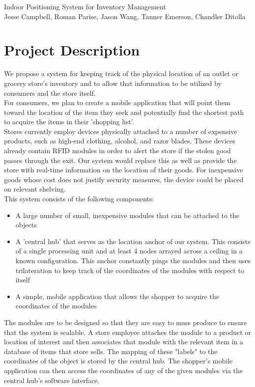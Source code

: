 \documentclass{article}
\begin{document}
\begin{center}
{\Large Indoor Positioning System for Inventory Management} \\
{\small Jesse Campbell, Roman Parise, Jason Wang, Tanner Emerson, Chandler Ditolla}
\end{center}
\section{Project Description}
We propose a system for keeping track of the physical location of an outlet or grocery store's inventory and to allow that information to be utilized by consumers and the store itself. \\

For consumers, we plan to create a mobile application that will point them toward the location of the item they seek and potentially find the shortest path to acquire the items in their 'shopping list'. \\

Stores currently employ devices physically attached to a number of expensive products, such as high-end clothing, alcohol, and razor blades. These devices already contain RFID modules in order to alert the store if the stolen good passes through the exit. Our system would replace this as well as provide the store with real-time information on the location of their goods. For inexpensive goods whose cost does not justify security measures, the device could be placed on relevant shelving.\\

This system consists of the following components:
\begin{itemize}
\item A large number of small, inexpensive modules that can be attached to the objects
\item A 'central hub' that serves as the location anchor of our system. This consists of a single processing unit and at least 4 nodes arrayed across a ceiling in a known configuration. This anchor constantly pings the modules and then uses trilateration to keep track of the coordinates of the modules with respect to itself
\item A simple, mobile application that allows the shopper to acquire the coordinates of the modules
\end{itemize}
The modules are to be designed so that they are easy to mass produce to ensure that the system is scalable.
A store employee attaches the module to a product or location of interest and then associates that module with the relevant item in a database of items that store sells.
The mapping of these "labels" to the coordinates of the object is stored by the central hub.
The shopper's mobile application can then access the coordinates of any of the given modules via the central hub's software interface.
\end{document}
